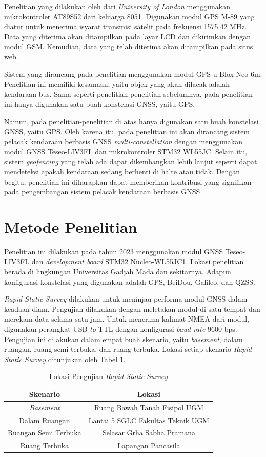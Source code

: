 \documentclass[conference]{IEEEtran}
\begin{document}
Penelitian yang dilakukan oleh \cite{Mukhtar2015} dari \textit{University of London} menggunakan mikrokontroler AT89S52 dari keluarga 8051. Digunakan modul GPS M-89 yang diatur untuk menerima isyarat transmisi satelit pada frekuensi 1575.42 MHz. Data yang diterima akan ditampilkan pada layar LCD dan dikirimkan dengan modul GSM. Kemudian, data yang telah diterima akan ditampilkan pada situs web.

Sistem yang dirancang pada penelitian \cite{Widya2016} menggunakan modul GPS u-Blox Neo 6m. Penelitian ini memiliki kesamaan, yaitu objek yang akan dilacak adalah kendaraan bus. Sama seperti penelitian-penelitian sebelumnya, pada penelitian ini hanya digunakan satu buah konstelasi GNSS, yaitu GPS.

Namun, pada penelitian-penelitian di atas hanya digunakan satu buah konstelasi GNSS, yaitu GPS. Oleh karena itu, pada penelitian ini akan dirancang sistem pelacak kendaraan berbasis GNSS \textit{multi-constellation} dengan menggunakan modul GNSS Teseo-LIV3FL dan mikrokontroler STM32 WL55JC. Selain itu, sistem \textit{geofencing} yang telah ada dapat dikembangkan lebih lanjut seperti dapat mendeteksi apakah kendaraan sedang berhenti di halte atau tidak. Dengan begitu, penelitian ini diharapkan dapat memberikan kontribusi yang signifikan pada pengembangan sistem pelacak kendaraan berbasis GNSS.

\section{Metode Penelitian}
Penelitian ini dilakukan pada tahun 2023 menggunakan modul GNSS Teseo-LIV3FL dan \textit{development board} STM32 Nucleo-WL55JC1. Lokasi penelitian berada di lingkungan Universitas Gadjah Mada dan sekitarnya. Adapun konfigurasi konstelasi yang digunakan adalah GPS, BeiDou, Galileo, dan QZSS.

\textit{Rapid Static Survey} dilakukan untuk meninjau performa modul GNSS dalam keadaan diam. Pengujian dilakukan dengan meletakan modul di satu tempat dan merekam data selama satu jam. Untuk menerima kalimat NMEA dari modul, digunakan perangkat USB \textit{to} TTL dengan konfigurasi \textit{baud rate} 9600 bps. Pengujian ini dilakukan dalam empat buah skenario, yaitu \textit{basement}, dalam ruangan, ruang semi terbuka, dan ruang terbuka. Lokasi setiap skenario \textit{Rapid Static Survey} ditunjukan oleh Tabel \ref{tab: rss-location}.

\begin{table}[hbt!]
	\caption{Lokasi Pengujian \textit{Rapid Static Survey}}
	\centering
	\renewcommand{\arraystretch}{1.5}
	\begin{tabular}{cc}
		\hline
		\textbf{Skenario} & \textbf{Lokasi} \\\hline
		\textit{Basement} &Ruang Bawah Tanah Fisipol UGM\\
		Dalam Ruangan & Lantai 5 SGLC Fakultas Teknik UGM\\
		Ruangan Semi Terbuka &  Selasar Grha Sabha Pramana\\
		Ruang Terbuka & Lapangan Pancasila\\
		\hline
	\end{tabular}
	\label{tab: rss-location}
\end{table}
\end{document}
